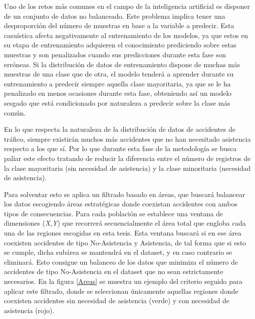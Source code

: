 Uno de los retos más comunes en el campo de la inteligencia artificial es disponer de un conjunto de datos no balanceado. Este problema implica tener una desproporción del número de muestras en base a la variable a predecir. Esta casuística afecta negativamente al entrenamiento de los modelos, ya que estos en su etapa de entrenamiento adquieren el conocimiento prediciendo sobre estas muestras y son penalizados cuando sus predicciones durante esta fase son erróneas. Si la distribución de datos de entrenamiento dispone de muchas más muestras de una clase que de otra, el modelo tenderá a aprender durante su entrenamiento a predecir siempre aquella clase mayoritaria, ya que se le ha penalizado en menos ocasiones durante esta fase, obteniendo así un modelo sesgado que está condicionado por naturaleza a predecir sobre la clase más común.

En lo que respecta la naturaleza de la distribución de datos de accidentes de tráfico, siempre existirán muchos más accidentes que no han necesitado asistencia respecto a los que sí. Por lo que durante esta fase de la metodología se busca paliar este efecto tratando de reducir la diferencia entre el número de registros de la clase mayoritaria (sin necesidad de asistencia) y la clase minoritaria (necesidad de asistencia).

Para solventar esto se aplica un filtrado basado en áreas, que buscará balancear los datos escogiendo áreas estratégicas donde coexistan accidentes con ambos tipos de consecuencias. Para cada población se establece una ventana de dimensiones (\textit{X,Y}) que recorrerá secuencialmente el área total que engloba cada una de las regiones escogidas en esta tesis. Esta ventana buscará si en ese área coexisten accidentes de tipo No-Asistencia y Asistencia, de tal forma que si esto se cumple, dicha subárea se mantendrá en el dataset, y en caso contrario se eliminará. Esto consigue un balanceo de los datos que minimiza el número de accidentes de tipo No-Asistencia en el dataset que no sean estrictamente necesarios. En la figura \ref{Areas} se muestra un ejemplo del criterio seguido para aplicar este filtrado, donde se seleccionan únicamente aquellas regiones donde coexisten accidentes sin necesidad de asistencia (verde) y con necesidad de asistencia (rojo).


